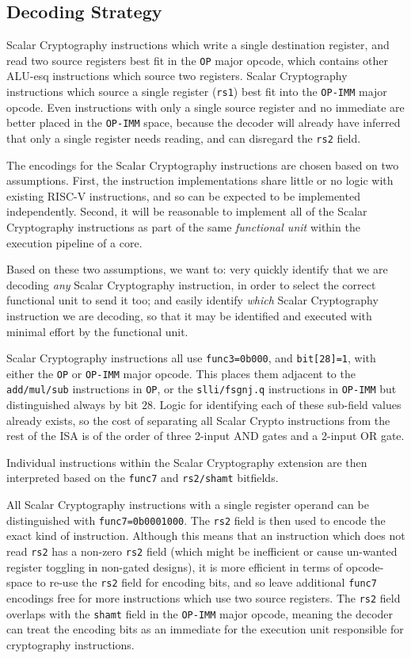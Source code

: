 \subsection{Decoding Strategy}

Scalar Cryptography instructions which write a single
destination register, and read two source registers
best fit in the {\tt OP} major opcode, which contains other ALU-esq
instructions which source two registers.
Scalar Cryptography instructions which source a single register ({\tt rs1})
best fit into the {\tt OP-IMM} major opcode.
Even instructions with only a single source register and no immediate are
better placed in the {\tt OP-IMM} space, because the decoder will already
have inferred that only a single register needs reading, and can disregard
the {\tt rs2} field.

The encodings for the Scalar Cryptography instructions are chosen based on
two assumptions.
First, the instruction implementations share little or no logic with existing
RISC-V instructions, and so can be expected to be implemented
independently.
Second, it will be reasonable to implement all of the Scalar Cryptography
instructions as part of the same {\em functional unit} within the
execution pipeline of a core.

Based on these two assumptions, we want to:
very quickly identify
that we are decoding {\em any} Scalar Cryptography instruction, in order to
select the correct functional unit to send it too; and
easily identify {\em which} Scalar Cryptography instruction we are decoding,
so that it may be identified and executed with minimal effort by the
functional unit.

Scalar Cryptography instructions all use {\tt func3=0b000},
and {\tt bit[28]=1}, with either the {\tt OP} or {\tt OP-IMM} major opcode.
This places them adjacent to the {\tt add/mul/sub} instructions in {\tt OP},
or the {\tt slli/fsgnj.q} instructions in {\tt OP-IMM} 
but distinguished always by bit $28$.
Logic for identifying each of these sub-field values already exists, so
the cost of separating all Scalar Crypto instructions from the rest of the
ISA is of the order of three 2-input AND gates and a 2-input OR gate.

Individual instructions within the Scalar Cryptography extension
are then interpreted based on the {\tt func7} and {\tt rs2/shamt} bitfields.

All Scalar Cryptography instructions with a single register operand can be distinguished
with {\tt func7=0b0001000}.
The {\tt rs2} field is then used to encode the exact kind of instruction.
Although this means that an instruction which does not read {\tt rs2} has
a non-zero {\tt rs2} field (which might be inefficient or cause un-wanted
register toggling in non-gated designs),
it is more efficient in terms of opcode-space to re-use the {\tt rs2} field
for encoding bits, and
so leave additional {\tt func7} encodings free for more instructions which
use two source registers.
The {\tt rs2} field overlaps with the {\tt shamt} field in the {\tt OP-IMM}
major opcode, meaning the decoder can treat the encoding bits as an
immediate for the execution unit responsible for cryptography
instructions.

